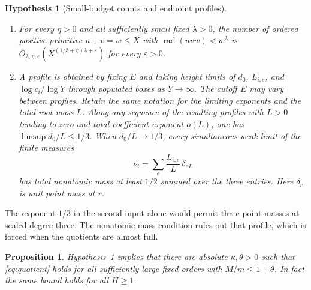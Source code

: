 \documentclass[11pt,reqno]{amsart}
\newtheorem{proposition}[theorem]{Proposition}
\newtheorem{hypothesis}[theorem]{Hypothesis}
\DeclareMathOperator{\rad}{rad}
\newcommand{\eps}{\varepsilon}
\begin{document}
\begin{hypothesis}[Small-budget counts and endpoint profiles]\label{hyp:endpoint}
\leavevmode
\begin{enumerate}
\item For every \(\eta>0\) and all sufficiently small fixed \(\lambda>0\),
the number of ordered positive primitive \(u+v=w\le X\) with
\(\rad(uvw)<w^\lambda\) is
\(O_{\lambda,\eta,\eps}(X^{(1/3+\eta)\lambda+\eps})\) for every \(\eps>0\).
\item A profile is obtained by fixing \(E\) and taking height limits of
\(d_0\), \(L_{i,e}\), and \(\log c_i/\log Y\) through populated boxes
as \(Y\to\infty\). The cutoff \(E\) may vary between profiles. Retain
the same notation for the limiting exponents and the total root mass \(L\). Along
any sequence of the resulting profiles with \(L>0\) tending to zero and
total coefficient exponent \(o(L)\), one has \(\limsup d_0/L\le1/3\).
When \(d_0/L\to1/3\), every simultaneous
weak limit of the finite measures
\begin{equation}\label{eq:measures}
  \nu_i=\sum_e\frac{L_{i,e}}{L}\,\delta_{eL}
\end{equation}
has total nonatomic mass at least \(1/2\) summed over the three entries.
Here \(\delta_r\) is unit point mass at \(r\).
\end{enumerate}
\end{hypothesis}

The exponent \(1/3\) in the second input alone would permit three point
masses at scaled degree three. The nonatomic mass condition rules out
that profile, which is forced when the quotients are almost full.

\begin{proposition}\label{prop:endpoint}
Hypothesis~\ref{hyp:endpoint} implies that there are absolute
\(\kappa,\theta>0\) such that \eqref{eq:quotient} holds for all sufficiently
large fixed orders with \(M/m\le1+\theta\). In fact the same bound holds
for all \(H\ge1\).
\end{proposition}
\end{document}
